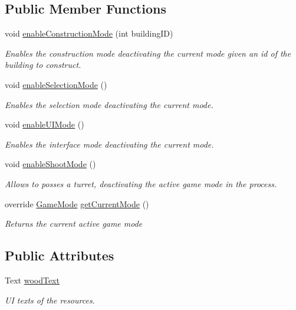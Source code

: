 \subsection*{Public Member Functions}
\begin{DoxyCompactItemize}
\item 
void \mbox{\hyperlink{class_game_mode_manager_a3571ab1df61bc08ade07a49fefac6806}{enable\+Construction\+Mode}} (int building\+ID)
\begin{DoxyCompactList}\small\item\em Enables the construction mode deactivating the current mode given an id of the building to construct. \end{DoxyCompactList}\item 
void \mbox{\hyperlink{class_game_mode_manager_a593ebd11a47f34970079b487c1ee1903}{enable\+Selection\+Mode}} ()
\begin{DoxyCompactList}\small\item\em Enables the selection mode deactivating the current mode. \end{DoxyCompactList}\item 
void \mbox{\hyperlink{class_game_mode_manager_a266f436dd6216a6a59bbb0bacdf247fe}{enable\+U\+I\+Mode}} ()
\begin{DoxyCompactList}\small\item\em Enables the interface mode deactivating the current mode. \end{DoxyCompactList}\item 
void \mbox{\hyperlink{class_game_mode_manager_a48288aeaccf2585ec6c8007c1b59c825}{enable\+Shoot\+Mode}} ()
\begin{DoxyCompactList}\small\item\em Allows to posses a turret, deactivating the active game mode in the process. \end{DoxyCompactList}\item 
override \mbox{\hyperlink{class_game_mode}{Game\+Mode}} \mbox{\hyperlink{class_game_mode_manager_a11cd556a3f6c2a97136de40bbf62633c}{get\+Current\+Mode}} ()
\begin{DoxyCompactList}\small\item\em Returns the current active game mode \end{DoxyCompactList}\end{DoxyCompactItemize}
\subsection*{Public Attributes}
\begin{DoxyCompactItemize}
\item 
Text \mbox{\hyperlink{class_game_mode_manager_a29e2b01816f5a4b0dc03ebf086f04c30}{wood\+Text}}
\begin{DoxyCompactList}\small\item\em UI texts of the resources. \end{DoxyCompactList}\end{DoxyCompactItemize}
